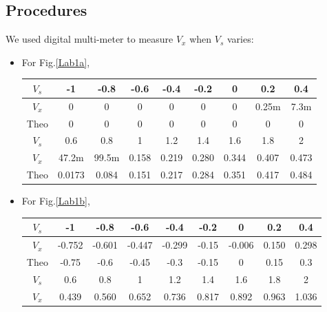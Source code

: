     \subsection{Procedures}
    We used digital multi-meter to measure $V_x$ when $V_s$ varies:\par
    \begin{itemize}
        \item For Fig.\ref{Lab1a},\par
            \begin{table}[h]
            \centering
            \begin{tabular}{|c|c|c|c|c|c|c|c|c|}
            \hline
                $V_s$ & -1     & -0.8  & -0.6  & -0.4  & -0.2  & 0     & 0.2   & 0.4   \\ \hline
                $V_x$ & 0      & 0     & 0     & 0     & 0     & 0     & 0.25m & 7.3m  \\ \hline
                Theo  & 0      & 0     & 0     & 0     & 0     & 0     & 0     & 0     \\ \hline
                $V_s$ & 0.6    & 0.8   & 1     & 1.2   & 1.4   & 1.6   & 1.8   & 2     \\ \hline
                $V_x$ & 47.2m  & 99.5m & 0.158 & 0.219 & 0.280 & 0.344 & 0.407 & 0.473 \\ \hline
                Theo  & 0.0173 & 0.084 & 0.151 & 0.217 & 0.284 & 0.351 & 0.417 & 0.484 \\ \hline
            \end{tabular}
            \end{table}
            \FloatBarrier
        \item For Fig.\ref{Lab1b},\par
            \begin{table}[h]
            \centering
            \begin{tabular}{|c|c|c|c|c|c|c|c|c|}
            \hline
                $V_s$ & -1     & -0.8   & -0.6   & -0.4   & -0.2  & 0      & 0.2   & 0.4   \\ \hline
                $V_x$ & -0.752 & -0.601 & -0.447 & -0.299 & -0.15 & -0.006 & 0.150 & 0.298 \\ \hline
                Theo  & -0.75  & -0.6   & -0.45  & -0.3   & -0.15 & 0      & 0.15  & 0.3   \\ \hline
                $V_s$ & 0.6    & 0.8    & 1      & 1.2    & 1.4   & 1.6    & 1.8   & 2     \\ \hline
                $V_x$ & 0.439  & 0.560  & 0.652  & 0.736  & 0.817 & 0.892  & 0.963 & 1.036 \\ \hline

\end{tabular}
\end{table}
\end{itemize}
